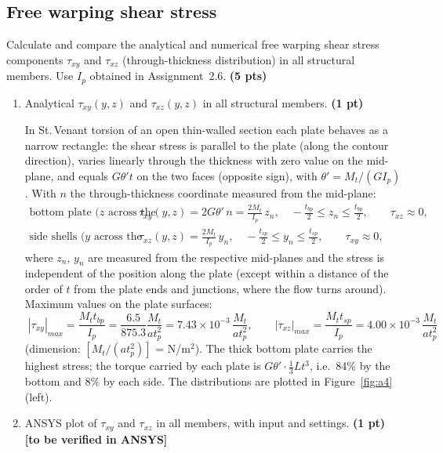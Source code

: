\subsection{Free warping shear stress}

Calculate and compare the analytical and numerical free warping shear stress components $\tau_{xy}$ and $\tau_{xz}$ (through-thickness distribution) in all structural members. Use $I_p$ obtained in Assignment~2.6. \textbf{(5 pts)}

\begin{enumerate}[label=\roman*.]
  \item Analytical $\tau_{xy}(y,z)$ and $\tau_{xz}(y,z)$ in all structural members. \textbf{(1 pt)}

  In St.\,Venant torsion of an open thin-walled section each plate behaves as a narrow rectangle: the shear stress is parallel to the plate (along the contour direction), varies linearly through the thickness with zero value on the mid-plane, and equals $G\theta't$ on the two faces (opposite sign), with $\theta'=M_t/(GI_p)$. With $n$ the through-thickness coordinate measured from the mid-plane:
  \begin{align}
    \text{bottom plate ($z$ across the thickness): }&\ \tau_{xy}(y,z)=2G\theta'\,n=\frac{2M_t}{I_p}\,z_n,\quad -\tfrac{t_{bp}}{2}\le z_n\le\tfrac{t_{bp}}{2},\qquad \tau_{xz}\approx0,\\
    \text{side shells ($y$ across the thickness): }&\ \tau_{xz}(y,z)=\frac{2M_t}{I_p}\,y_n,\quad -\tfrac{t_{sp}}{2}\le y_n\le\tfrac{t_{sp}}{2},\qquad \tau_{xy}\approx0,
  \end{align}
  where $z_n$, $y_n$ are measured from the respective mid-planes and the stress is independent of the position along the plate (except within a distance of the order of $t$ from the plate ends and junctions, where the flow turns around). Maximum values on the plate surfaces:
  \begin{equation}
    \boxed{\;|\tau_{xy}|_{max}=\frac{M_tt_{bp}}{I_p}=\frac{6.5}{875.3}\frac{M_t}{at_p^2}=7.43\times10^{-3}\,\frac{M_t}{at_p^2},\qquad
    |\tau_{xz}|_{max}=\frac{M_tt_{sp}}{I_p}=4.00\times10^{-3}\,\frac{M_t}{at_p^2}\;}
  \end{equation}
  (dimension: $[M_t/(at_p^2)]$ = N/m$^2$). The thick bottom plate carries the highest stress; the torque carried by each plate is $G\theta'\cdot\frac13Lt^3$, i.e.\ 84\% by the bottom and 8\% by each side. The distributions are plotted in Figure~\ref{fig:a4}(left).

  \item ANSYS plot of $\tau_{xy}$ and $\tau_{xz}$ in all members, with input and settings. \textbf{(1 pt)} \textbf{[to be verified in ANSYS]}


\end{enumerate}
